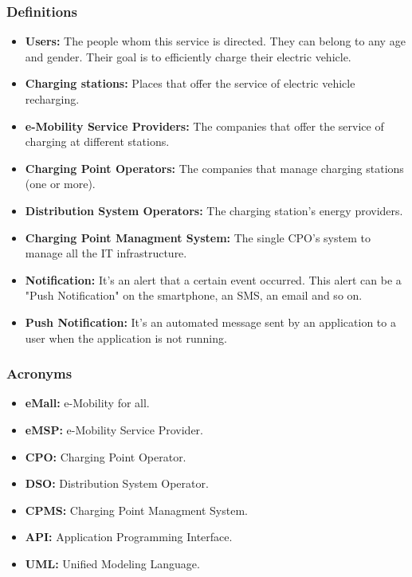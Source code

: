 \subsubsection{Definitions}
\begin{itemize}
        \item \textbf{Users:} The people whom this service is directed. 
        They can belong to any age and gender. 
        Their goal is to efficiently charge their electric vehicle.
        \item \textbf{Charging stations:} Places that offer the service of electric vehicle recharging.
        \item \textbf{e-Mobility Service Providers:} The companies that offer the service of charging at different stations.
        \item \textbf{Charging Point Operators:} The companies that manage charging stations (one or more).
        \item \textbf{Distribution System Operators:} The charging station's energy providers.
        \item \textbf{Charging Point Managment System:} The single CPO's system to manage all the IT infrastructure.
        \item \textbf{Notification:} It's an alert that a certain event occurred. 
        This alert can be a "Push Notification" on the smartphone, an SMS, an email and so on.
        \item \textbf{Push Notification:} It's an automated message sent by an application to a user when the application is not running.
\end{itemize}
\subsubsection{Acronyms}
\begin{itemize}
        \item \textbf{eMall:} e-Mobility for all.
        \item \textbf{eMSP:} e-Mobility Service Provider.
        \item \textbf{CPO:} Charging Point Operator.
        \item \textbf{DSO:} Distribution System Operator.
        \item \textbf{CPMS:} Charging Point Managment System.
        \item \textbf{API:} Application Programming Interface.
        \item \textbf{UML:} Unified Modeling Language.
\end{itemize}
